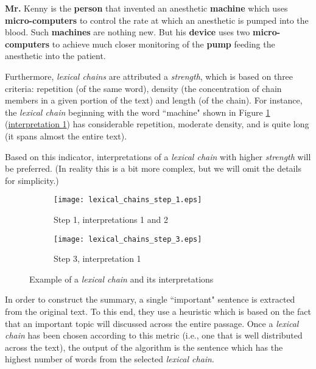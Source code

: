 \begin{displayquote}
\textbf{Mr.} Kenny is the \textbf{person} that invented an anesthetic \textbf{machine} which uses \textbf{micro-computers} to control the rate at which an anesthetic is pumped into the blood. Such \textbf{machines} are nothing new. But his \textbf{device} uses two \textbf{micro-computers} to achieve much closer monitoring of the \textbf{pump} feeding the anesthetic into the patient. \cite{barzilay_using_1997}
\end{displayquote}

Furthermore, \textit{lexical chains} are attributed a \textit{strength}, which is based on three criteria: repetition (of the same word), density (the concentration of chain members in a given portion of the text) and length (of the chain). For instance, the \textit{lexical chain} beginning with the word ``machine" shown in Figure \ref{fig:lexical_chain_example} (\underline{interpretation 1}) has considerable repetition, moderate density, and is quite long (it spans almost the entire text).

Based on this indicator, interpretations of a \textit{lexical chain} with higher \textit{strength} will be preferred. (In reality this is a bit more complex, but we will omit the details for simplicity.)

\begin{figure}[H]
\centering
\begin{subfigure}{0.45\textwidth}
\texttt{[image: lexical\_chains\_step\_1.eps]}
\caption{Step 1, interpretations 1 and 2}
\end{subfigure}
\begin{subfigure}{0.35\textwidth}
\texttt{[image: lexical\_chains\_step\_3.eps]}
\caption{Step 3, interpretation 1}
\end{subfigure}
\caption{\cite{barzilay_using_1997} Example of a \textit{lexical chain} and its interpretations}
\label{fig:lexical_chain_example}
\end{figure}

In order to construct the summary, a single ``important" sentence is extracted from the original text. To this end, they use a heuristic which is based on the fact that an important topic will discussed across the entire passage. Once a \textit{lexical chain} has been chosen according to this metric (i.e., one that is well distributed across the text), the output of the algorithm is the sentence which has the highest number of words from the selected \textit{lexical chain}.

